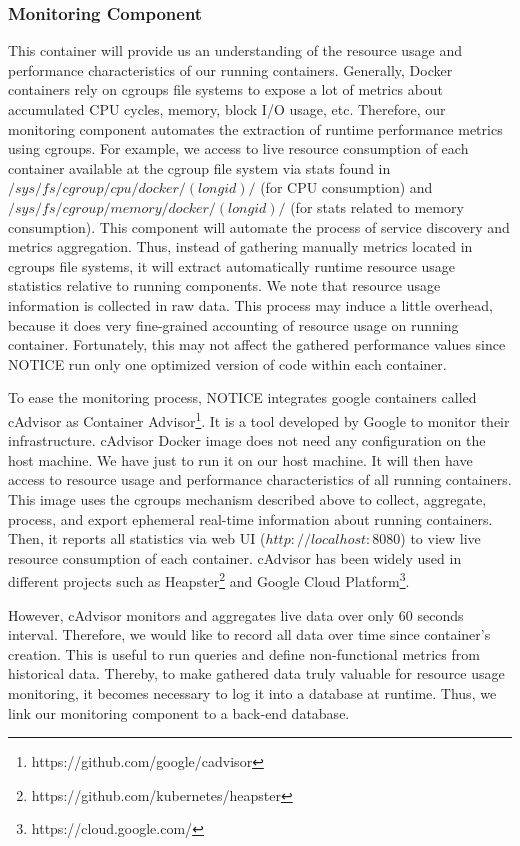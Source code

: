 \subsubsection{Monitoring Component}
This container will provide us an understanding of the resource usage and performance characteristics of our running containers. Generally, Docker containers rely on cgroups file systems to expose a lot of metrics about accumulated CPU cycles, memory, block I/O usage, etc. Therefore, our monitoring component automates the extraction of runtime performance metrics using cgroups. For example, we access to live resource consumption of each container available at the cgroup file system via stats found in $/sys/fs/cgroup/cpu/docker/(longid)/$ (for CPU consumption) and $/sys/fs/cgroup/memory/docker/(longid)/$ (for stats related to memory consumption). This component will automate the process of service discovery and metrics aggregation. Thus, instead of gathering manually metrics located in cgroups file systems, it will extract automatically runtime resource usage statistics relative to running components. We note that resource usage information is collected in raw data. This process may induce a little overhead, because it does very fine-grained accounting of resource usage on running container. Fortunately, this may not affect the gathered performance values since NOTICE run only one optimized version of code within each container.

To ease the monitoring process, NOTICE integrates google containers called cAdvisor as Container Advisor\footnote{https://github.com/google/cadvisor}. It is a tool developed by Google to monitor their infrastructure. 
cAdvisor Docker image does not need any configuration on the host machine. We have just to run it on our host machine. It will then have access to resource usage and performance characteristics of all running containers. This image uses the cgroups mechanism described above to collect, aggregate, process, and export ephemeral real-time information about running containers. Then, it reports all statistics via web UI ($http://localhost:8080$) to view live resource consumption of each container. cAdvisor has been widely used in different projects such as Heapster\footnote{https://github.com/kubernetes/heapster} and Google Cloud Platform\footnote{https://cloud.google.com/}.

However, cAdvisor monitors and aggregates live data over only 60 seconds interval. Therefore, we would like to record all data over time since container's creation. This is useful to run queries and define non-functional metrics from historical data. Thereby, to make gathered data truly valuable for resource usage monitoring, it becomes necessary to log it into a database at runtime. Thus, we link our monitoring component to a back-end database. 
